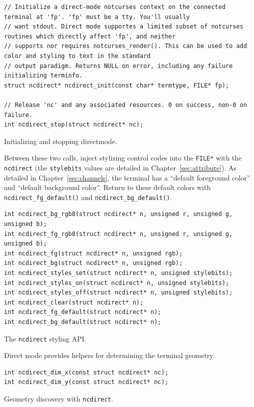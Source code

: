 \documentclass[letterpaper,10pt]{article}
\begin{document}
\begin{listing}[!htb]
\begin{verbatim}
// Initialize a direct-mode notcurses context on the connected terminal at 'fp'. 'fp' must be a tty. You'll usually
// want stdout. Direct mode supportes a limited subset of notcurses routines which directly affect 'fp', and neither
// supports nor requires notcurses_render(). This can be used to add color and styling to text in the standard
// output paradigm. Returns NULL on error, including any failure initializing terminfo.
struct ncdirect* ncdirect_init(const char* termtype, FILE* fp);

// Release 'nc' and any associated resources. 0 on success, non-0 on failure.
int ncdirect_stop(struct ncdirect* nc);
\end{verbatim}
\caption{Initializing and stopping directmode.}
\end{listing}

Between these two calls, inject stylizing control codes into the \texttt{FILE*} with
the \texttt{ncdirect} (the \texttt{stylebits} values are detailed in Chapter~\ref{sec:attribute}).
As detailed in Chapter~\ref{sec:channels}, the terminal has a ``default foreground color''
and ``default background color''. Return to these default colors with
\texttt{ncdirect\_fg\_default()} and \texttt{ncdirect\_bg\_default()}.

\begin{listing}[!htb]
\begin{verbatim}
int ncdirect_bg_rgb8(struct ncdirect* n, unsigned r, unsigned g, unsigned b);
int ncdirect_fg_rgb8(struct ncdirect* n, unsigned r, unsigned g, unsigned b);
int ncdirect_fg(struct ncdirect* n, unsigned rgb);
int ncdirect_bg(struct ncdirect* n, unsigned rgb);
int ncdirect_styles_set(struct ncdirect* n, unsigned stylebits);
int ncdirect_styles_on(struct ncdirect* n, unsigned stylebits);
int ncdirect_styles_off(struct ncdirect* n, unsigned stylebits);
int ncdirect_clear(struct ncdirect* n);
int ncdirect_fg_default(struct ncdirect* n);
int ncdirect_bg_default(struct ncdirect* n);
\end{verbatim}
\caption{The \texttt{ncdirect} styling API.}
\end{listing}

Direct mode provides helpers for determining the terminal geometry.

\begin{listing}[!htb]
\begin{verbatim}
int ncdirect_dim_x(const struct ncdirect* nc);
int ncdirect_dim_y(const struct ncdirect* nc);
\end{verbatim}
\caption{Geometry discovery with \texttt{ncdirect}.}
\end{listing}
\end{document}

